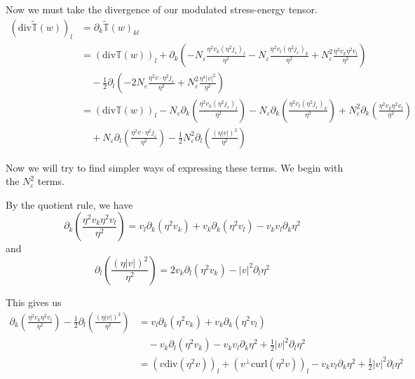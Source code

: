 \documentclass[a4paper]{article}
\newcommand{\curl}{\mathrm{curl}}
\renewcommand{\div}{\mathrm{div}}
\begin{document}
Now we must take the divergence of our modulated stress-energy tensor.
\begin{align}
  ( \div \tilde{\mathbb{T}}(w) )_l &= \partial_k \tilde{\mathbb{T}}(w)_{kl} \nonumber \\
  &= ( \div \mathbb{T}(w) )_l + \partial_k \left( - N_\varepsilon \frac{\eta^2 v_k (\eta^2 j_\varepsilon)_l}{\eta^2} - N_\varepsilon \frac{\eta^2 v_l
  (\eta^2 j_\varepsilon)_k}{\eta^2} +  N_\varepsilon^2 \frac{\eta^2 v_k \eta^2 v_l}{\eta^2} \right) \nonumber \\
  &\quad - \frac{1}{2} \partial_l \left( -2 N_\varepsilon \frac{\eta^2 v \cdot \eta^2 j_\varepsilon}{\eta^2} + N_\varepsilon^2 \frac{\eta^4
  |v|^2}{\eta^2} \right) \nonumber \\
  &= (\div \mathbb{T}(w))_l - N_\varepsilon \partial_k \left( \frac{\eta^2 v_k (\eta^2 j_\varepsilon)_l}{\eta^2} \right) - N_\varepsilon
  \partial_k \left( \frac{\eta^2 v_l (\eta^2 j_\varepsilon)_k}{\eta^2} \right) + N_\varepsilon^2 \partial_k \left( \frac{\eta^2 v_k \eta^2
  v_l}{\eta^2} \right) \nonumber \\
  &\quad + N_\varepsilon \partial_l \left( \frac{\eta^2 v \cdot \eta^2 j_\varepsilon}{\eta^2} \right) - \frac{1}{2} N_\varepsilon^2 \partial_l \left( \frac{(\eta |v|)^2}{\eta^2} \right)
  \label{eqn:div_mod_stress_energy1}
\end{align}

Now we will try to find simpler ways of expressing these terms. We begin with the $N_\varepsilon^2$ terms.

By the quotient rule, we have
\begin{equation}
  \partial_k \left( \frac{\eta^2 v_k \eta^2 v_l}{\eta^2} \right) = v_l \partial_k (\eta^2 v_k) + v_k \partial_k(\eta^2 v_l) - v_k v_l \partial_k
  \eta^2
  \label{eqn:quot_rule1}
\end{equation}
and
\begin{equation}
  \partial_l \left( \frac{(\eta |v|)^2}{\eta^2} \right) = 2 v_k \partial_l (\eta^2 v_k) - |v|^2 \partial_l \eta^2
  \label{eqn:quot_rule2}
\end{equation}

This gives us
\begin{align}
  \partial_k \left( \frac{\eta^2 v_k \eta^2 v_l}{\eta^2} \right) - \frac{1}{2} \partial_l \left( \frac{(\eta |v|)^2}{\eta^2} \right) &= v_l \partial_k (\eta^2
  v_k) + v_k \partial_k( \eta^2 v_l ) \nonumber \\
  &\quad - v_k \partial_l (\eta^2 v_k) - v_k v_l \partial_k \eta^2 + \frac{1}{2} |v|^2 \partial_l \eta^2 \nonumber \\
  &= (v \div( \eta^2 v ) )_l + (v^\perp \curl( \eta^2 v) )_l - v_k v_l \partial_k \eta^2 + \frac{1}{2} |v|^2 \partial_l \eta^2
  \label{eqn:quot_rules}
\end{align}
\end{document}
